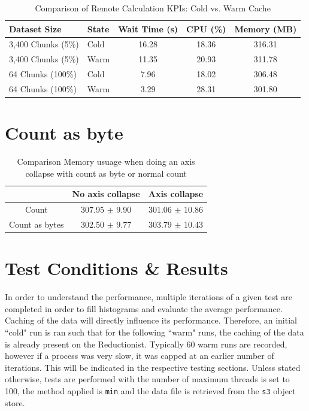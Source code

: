 \documentclass{article}
\begin{document}
\begin{table}[h!]
\centering
\begin{tabular}{|l|l|c|c|c|}
\hline
\textbf{Dataset Size} & \textbf{State} & \textbf{Wait Time (s)} & \textbf{CPU (\%)} & \textbf{Memory (MB)} \\ \hline
3,400 Chunks (5\%) & Cold & 16.28 & 18.36 & 316.31 \\ \hline
3,400 Chunks (5\%) & Warm & 11.35 & 20.93 & 311.78 \\ \hline  \hline
64 Chunks (100\%) & Cold & 7.96 & 18.02 & 306.48 \\ \hline
64 Chunks (100\%) & Warm & 3.29 & 28.31 & 301.80 \\ \hline
\end{tabular}
\caption{Comparison of Remote Calculation KPIs: Cold vs. Warm Cache}
\label{tab:kpi_results}
\end{table}

\section{Count as byte}

\begin{table}[h!]
\centering
\begin{tabular}{c|cc}
\hline
                   & No axis collapse & Axis collapse \\ \hline
Count              & 307.95 $\pm$ 9.90  & 301.06 $\pm$ 10.86 \\
Count as bytes     & 302.50 $\pm$ 9.77  & 303.79 $\pm$ 10.43 \\ \hline
\end{tabular}
\caption{Comparison Memory usuage when doing an axis collapse with count as byte or normal count}
\label{tab:count_as_byte}
\end{table}













\section{Test Conditions \& Results}

In order to understand the performance, multiple iterations of a given test are completed in order to fill histograms and evaluate the average performance. Caching of the data will directly influence its performance. Therefore, an initial ``cold" run is ran such that for the following ``warm" runs, the caching of the data is already present on the Reductionist. Typically 60 warm runs are recorded, however if a process was very slow, it was capped at an earlier number of iterations. This will be indicated in the respective testing sections. Unless stated otherwise, tests are performed with the number of maximum threads is set to 100, the method applied is \texttt{min} and the data file is retrieved from the \texttt{s3} object store.
\end{document}
